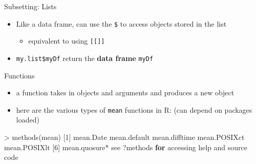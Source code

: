 \documentclass[
  ignorenonframetext,
]{beamer}
\newenvironment{Shaded}{\begin{snugshade}}{\end{snugshade}}
\newcommand{\ControlFlowTok}[1]{\textcolor[rgb]{0.13,0.29,0.53}{\textbf{#1}}}
\newcommand{\DecValTok}[1]{\textcolor[rgb]{0.00,0.00,0.81}{#1}}
\newcommand{\FunctionTok}[1]{\textcolor[rgb]{0.00,0.00,0.00}{#1}}
\newcommand{\NormalTok}[1]{#1}
\newcommand{\SpecialCharTok}[1]{\textcolor[rgb]{0.00,0.00,0.00}{#1}}
\newcommand{\StringTok}[1]{\textcolor[rgb]{0.31,0.60,0.02}{#1}}
\providecommand{\tightlist}{%
  \setlength{\itemsep}{0pt}\setlength{\parskip}{0pt}}
\begin{document}
\begin{frame}[fragile]{Subsetting: Lists}
\protect\hypertarget{subsetting-lists-3}{}
\begin{itemize}[<+->]
\tightlist
\item
  Like a data frame, can use the \texttt{\$} to access objects stored in
  the list

  \begin{itemize}[<+->]
  \tightlist
  \item
    equivalent to using \texttt{{[}{[}{]}{]}}
  \end{itemize}
\item
  \texttt{my.list\$myDf} return the \textbf{data frame} \texttt{myDf}
\end{itemize}

\begin{Shaded}
\end{Shaded}
\end{frame}

\begin{frame}[fragile]{Functions}
\protect\hypertarget{functions}{}
\begin{itemize}[<+->]
\tightlist
\item
  a function takes in objects and arguments and produces a new object
\item
  here are the various types of \texttt{mean} functions in R: (can
  depend on packages loaded)
\end{itemize}

\begin{Shaded}
\begin{Highlighting}[]
\SpecialCharTok{\textgreater{}} \FunctionTok{methods}\NormalTok{(mean)}
\NormalTok{[}\DecValTok{1}\NormalTok{] mean.Date     mean.default  mean.difftime mean.POSIXct  mean.POSIXlt }
\NormalTok{[}\DecValTok{6}\NormalTok{] mean.quosure}\SpecialCharTok{*}
\NormalTok{see }\StringTok{\textquotesingle{}?methods\textquotesingle{}} \ControlFlowTok{for}\NormalTok{ accessing help and source code}
\end{Highlighting}
\end{Shaded}
\end{frame}
\end{document}

